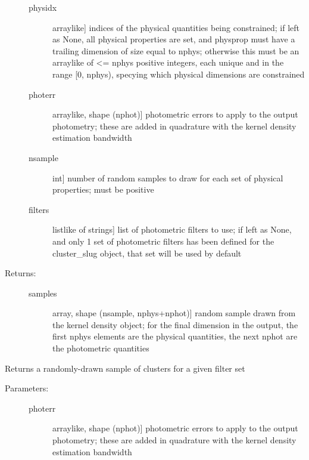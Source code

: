 \documentclass[letterpaper,10pt,english]{sphinxmanual}
\begin{document}
\begin{fulllineitems}
\begin{fulllineitems}
\begin{description}
\begin{description}
\item[{physidx}] \leavevmode{[}arraylike{]}
indices of the physical quantities being constrained; if
left as None, all physical properties are set, and
physprop must have a trailing dimension of size equal to
nphys; otherwise this must be an arraylike of \textless{}= nphys
positive integers, each unique and in the range {[}0,
nphys), specying which physical dimensions are
constrained

\item[{photerr}] \leavevmode{[}arraylike, shape (nphot){]}
photometric errors to apply to the output photometry;
these are added in quadrature with the kernel density
estimation bandwidth

\item[{nsample}] \leavevmode{[}int{]}
number of random samples to draw for each set of
physical properties; must be positive

\item[{filters}] \leavevmode{[}listlike of strings{]}
list of photometric filters to use; if left as None, and
only 1 set of photometric filters has been defined for
the cluster\_slug object, that set will be used by
default

\end{description}

\item[{Returns:}] \leavevmode\begin{description}
\item[{samples}] \leavevmode{[}array, shape (nsample, nphys+nphot){]}
random sample drawn from the kernel density object; for
the final dimension in the output, the first nphys
elements are the physical quantities, the next nphot are
the photometric quantities

\end{description}

\end{description}

\end{fulllineitems}


\begin{fulllineitems}
\label{\detokenize{cluster_slug:slugpy.cluster_slug.cluster_slug.draw_sample}}
Returns a randomly-drawn sample of clusters for a given filter
set
\begin{description}
\item[{Parameters:}] \leavevmode\begin{description}
\item[{photerr}] \leavevmode{[}arraylike, shape (nphot){]}
photometric errors to apply to the output photometry;
these are added in quadrature with the kernel density
estimation bandwidth


\end{description}
\end{description}
\end{fulllineitems}
\end{fulllineitems}
\end{document}
